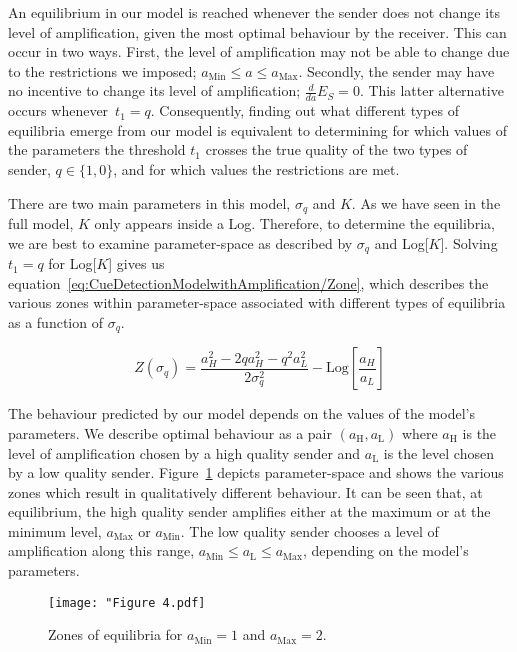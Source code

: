\documentclass[a4paper,12pt]{article}
\numberwithin{equation}{section}
\numberwithin{figure}{section}
\begin{document}
An equilibrium in our model is reached whenever the sender does not change its level of amplification, given the most optimal behaviour by the receiver. This can occur in two ways. First, the level of amplification may not be able to change due to the restrictions we imposed; $a_{\text{Min}} \leq a \leq a_{\text{Max}}$. Secondly, the sender may have no incentive to change its level of amplification; $\frac{d}{da} E_{S}=0$. This latter alternative occurs whenever~$t_{1}=q$. Consequently, finding out what different types of equilibria emerge from our model is equivalent to determining for which values of the parameters the threshold $t_{1}$ crosses the true quality of the two types of sender, $q \in \{1, 0\}$, and for which values the restrictions are met.

There are two main parameters in this model, $\sigma_{q}$ and $K$. As we have seen in the full model, $K$ only appears inside a Log. Therefore, to determine the equilibria, we are best to examine parameter-space as described by $\sigma_{q}$ and Log[$K$]. Solving $t_{1}=q$ for Log[$K$] gives us equation~\ref{eq:CueDetectionModelwithAmplification/Zone}, which describes the various zones within parameter-space associated with different types of equilibria as a function of $\sigma_{q}$.

\begin{equation}
\label{eq:CueDetectionModelwithAmplification/Zone}
Z(\sigma_{q})=\frac{a_{H}^{2} - 2 q a_{H}^{2}- q^{2} a_{L}^{2}}{2 \sigma_{q}^{2}} - \text{Log}[\frac{a_{H}}{a_{L}}]
\end{equation}

The behaviour predicted by our model depends on the values of the model's parameters. We describe optimal behaviour as a pair $(a_{\text{H}}, a_{\text{L}})$ where $a_{\text{H}}$ is the level of amplification chosen by a high quality sender and $a_{\text{L}}$ is the level chosen by a low quality sender. Figure~\ref{fig:Figure 4.pdf} depicts parameter-space and shows the various zones which result in qualitatively different behaviour. It can be seen that, at equilibrium, the high quality sender amplifies either at the maximum or at the minimum level, $a_{\text{Max}}$ or $a_{\text{Min}}$. The low quality sender chooses a level of amplification along this range, $a_{\text{Min}} \leq a_{\text{L}} \leq a_{\text{Max}}$, depending on the model's parameters.

\begin{figure}[h]
\begin{center}
\leavevmode
\texttt{[image: "Figure 4.pdf]}
\caption[]{Zones of equilibria for $a_{\text{Min}}=1$ and $a_{\text{Max}}=2$.}
\label{fig:Figure 4.pdf}
\end{center}
\end{figure}
\end{document}
